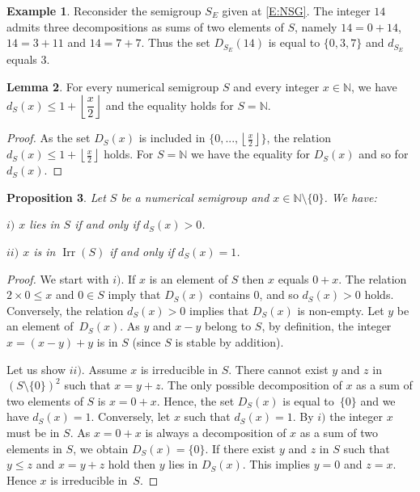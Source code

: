 \documentclass[reqno,11pt]{amsart}
\theoremstyle{plain}
\newtheorem{prop}{Proposition}[section]
\theoremstyle{definition}
\newtheorem{exam}[prop]{Example}
\newtheorem{lem}[prop]{Lemma}
\renewcommand{\leq}{\leqslant}
\newcommand{\NN}{\mathbb{N}}
\DeclareMathOperator{\Irr}{Irr}
\begin{document}
\begin{exam}
Reconsider the semigroup $S_E$ given at \eqref{E:NSG}.
The integer $14$ admits three decompositions as sums of two elements of $S$, namely $14=0+14$, $14=3+11$ and $14=7+7$. 
Thus the set $D_{S_E}(14)$ is equal to $\{0,3,7\}$ and $d_{S_E}$ equals $3$.
\end{exam}


\begin{lem}
\label{L:RepN}
For every numerical semigroup $S$ and every integer $x\in \NN$,  we have $d_S(x)\leq 1+\left\lfloor \dfrac{x}2\right\rfloor$ and the equality holds for $S=\NN$.
\end{lem}

\begin{proof}
As the set $D_S(x)$ is included in $\{0,...,\left\lfloor\frac x2\right\rfloor\}$, the relation $d_S(x)\leq 1+\left\lfloor \frac{x}2\right\rfloor$ holds.
For $S=\NN$ we have the equality for $D_S(x)$ and so for $d_S(x)$.
\end{proof}


\begin{prop}
\label{P:Dandd}
Let $S$ be a numerical semigroup and $x\in\NN\setminus\{0\}$.  We have:

 $i)$ $x$ lies in $S$ if and only if $d_S(x)>0$.

 $ii)$ $x$ is in $\Irr(S)$ if and only if $d_S(x)=1$.
\end{prop}

\begin{proof}
We start with $i)$. If $x$ is an element of $S$ then $x$ equals $0+x$. 
The relation~$2\times 0\leq x$ and $0\in S$ imply that $D_S(x)$ contains $0$, and so $d_S(x)>0$ holds.
Conversely, the relation  $d_S(x)>0$  implies that $D_S(x)$ is non-empty. 
Let $y$ be an element of~$D_S(x)$. 
As $y$ and $x-y$ belong to  $S$, by definition, the integer $x=(x-y)+y$ is in $S$  (since $S$ is stable by addition).

Let us show $ii)$. 
Assume $x$ is irreducible in $S$.
There cannot exist $y$ and $z$ in~$(S\setminus\{0\})^2$ such that $x=y+z$. 
The only possible decomposition of $x$ as a sum of two elements of $S$ is $x=0+x$. 
Hence, the set $D_S(x)$ is equal to~$\{0\}$ and we have $d_S(x)=1$. 
Conversely, let $x$ such that $d_S(x)=1$. 
By  $i)$ the  integer $x$ must be in $S$. 
As $x=0+x$ is always a decomposition of $x$ as a sum of two elements in $S$, we obtain $D_S(x)=\{0\}$.
If there exist $y$ and $z$ in $S$ such that $y\leq z$ and $x=y+z$ hold then $y$ lies in $D_S(x)$. 
This implies $y=0$ and $z=x$. 
Hence $x$ is irreducible in~$S$.
\end{proof}
\end{document}
